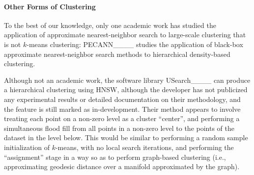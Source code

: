 \paragraph{Other Forms of Clustering}
To the best of our knowledge, only one academic work has studied the application of approximate nearest-neighbor search to large-scale clustering that is not $k$-means clustering:
PECANN____ studies the application of black-box approximate nearest-neighbor search methods to hierarchical density-based clustering.

Although not an academic work,
the software library USearch____ can produce a hierarchical clustering using HNSW,
although the developer has not
publicized any experimental results or detailed documentation on their methodology,
and the feature is still marked as in-development.
Their method appears to involve treating each point on a non-zero level as a cluster ``center'',
and performing a simultaneous flood fill from all points in a non-zero level to the points of the dataset in the level below.
This would be similar to performing a random sample initialization of $k$-means, with no local search iterations,
and performing the ``assignment'' stage in a way so as to perform graph-based clustering
(i.e., approximating geodesic distance over a manifold approximated by the graph).

\newpage